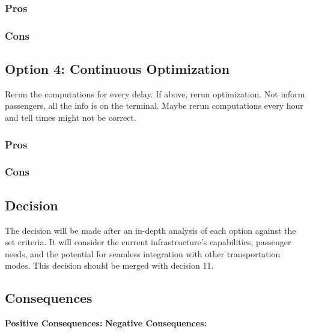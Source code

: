 \documentclass{article}
\begin{document}
\subsubsection*{Pros}
\subsubsection*{Cons}

\subsection*{Option 4: Continuous Optimization}
Rerun the computations for every delay. If above, rerun optimization. Not inform passengers, all the info is on the terminal. Maybe rerun computations every hour and tell times might not be correct.
\subsubsection*{Pros}
\subsubsection*{Cons}

\subsection*{Decision}
The decision will be made after an in-depth analysis of each option against the set criteria. It will consider the current infrastructure's capabilities, passenger needs, and the potential for seamless integration with other transportation modes. This decision should be merged with decision 11.

\subsection*{Consequences}
\textbf{Positive Consequences:}
\textbf{Negative Consequences:}
\end{document}

